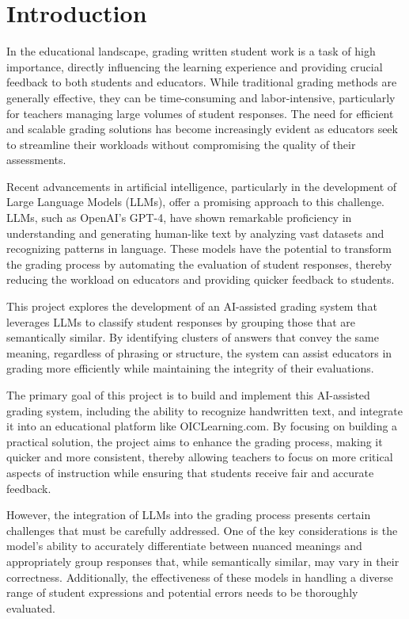 \documentclass[ms,twoside,print]{nuthesis}
\begin{document}
\chapter{Introduction}
In the educational landscape, grading written student work is a task of high importance, directly influencing the learning experience and providing crucial feedback to both students and educators. While traditional grading methods are generally effective, they can be time-consuming and labor-intensive, particularly for teachers managing large volumes of student responses. The need for efficient and scalable grading solutions has become increasingly evident as educators seek to streamline their workloads without compromising the quality of their assessments.

Recent advancements in artificial intelligence, particularly in the development of Large Language Models (LLMs), offer a promising approach to this challenge. LLMs, such as OpenAI's GPT-4, have shown remarkable proficiency in understanding and generating human-like text by analyzing vast datasets and recognizing patterns in language. These models have the potential to transform the grading process by automating the evaluation of student responses, thereby reducing the workload on educators and providing quicker feedback to students.

This project explores the development of an AI-assisted grading system that leverages LLMs to classify student responses by grouping those that are semantically similar. By identifying clusters of answers that convey the same meaning, regardless of phrasing or structure, the system can assist educators in grading more efficiently while maintaining the integrity of their evaluations.

The primary goal of this project is to build and implement this AI-assisted grading system, including the ability to recognize handwritten text, and integrate it into an educational platform like OICLearning.com. By focusing on building a practical solution, the project aims to enhance the grading process, making it quicker and more consistent, thereby allowing teachers to focus on more critical aspects of instruction while ensuring that students receive fair and accurate feedback.

However, the integration of LLMs into the grading process presents certain challenges that must be carefully addressed. One of the key considerations is the model's ability to accurately differentiate between nuanced meanings and appropriately group responses that, while semantically similar, may vary in their correctness. Additionally, the effectiveness of these models in handling a diverse range of student expressions and potential errors needs to be thoroughly evaluated.
\end{document}
